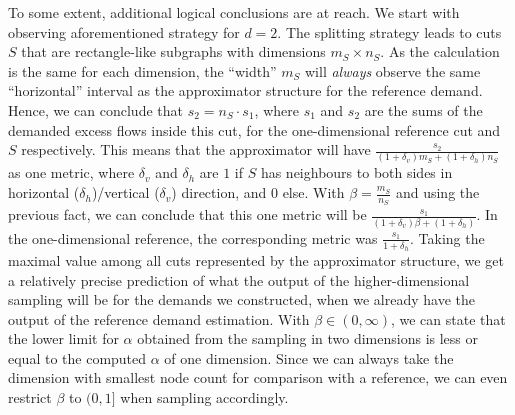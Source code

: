 To some extent, additional logical conclusions are at reach. We start with observing aforementioned strategy for $d=2$. The splitting strategy leads to cuts $S$ that are rectangle-like subgraphs with dimensions $m_S\times n_S$. As the calculation is the same for each dimension, the ``width'' $m_S$ will \textit{always} observe the same ``horizontal'' interval as the approximator structure for the reference demand. Hence, we can conclude that $s_2=n_S\cdot s_1$, where $s_1$ and $s_2$ are the sums of the demanded excess flows inside this cut, for the one-dimensional reference cut and $S$ respectively. This means that the approximator will have $\frac{s_2}{(1+\delta_v)m_S+(1+\delta_h)n_S}$ as one metric, where $\delta_v$ and $\delta_h$ are $1$ if $S$ has neighbours to both sides in horizontal ($\delta_h$)/vertical ($\delta_v$) direction, and $0$ else. With $\beta=\frac{m_S}{n_S}$ and using the previous fact, we can conclude that this one metric will be $\frac{s_1}{(1+\delta_v)\beta+(1+\delta_h)}$. In the one-dimensional reference, the corresponding metric was $\frac{s_1}{1+\delta_h}$. Taking the maximal value among all cuts represented by the approximator structure, we get a relatively precise prediction of what the output of the higher-dimensional sampling will be for the demands we constructed, when we already have the output of the reference demand estimation. With $\beta\in(0,\infty)$, we can state that the lower limit for $\alpha$ obtained from the sampling in two dimensions is less or equal to the computed $\alpha$ of one dimension. Since we can always take the dimension with smallest node count for comparison with a reference, we can even restrict $\beta$ to $(0,1]$ when sampling accordingly.
